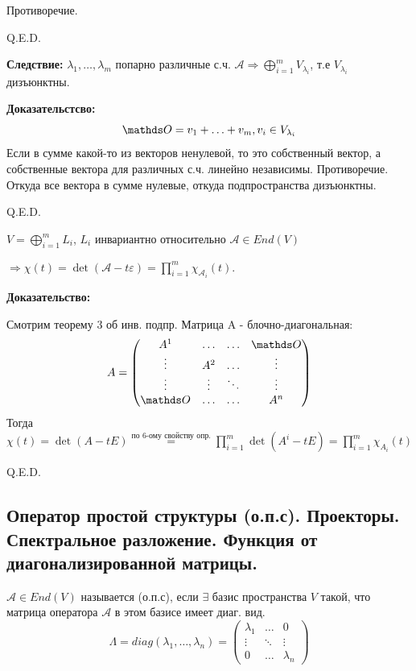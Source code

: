 Противоречие.

\hfill Q.E.D.

\textbf{Следствие:} $\lambda_1, \ldots,\lambda_m$ попарно различные с.ч. $\mathcal{A} \Rightarrow \bigoplus\limits_{i=1}^m V_{\lambda_i}$, т.е $V_{\lambda_i}$ дизъюнктны.

\textbf{Доказательстсво:}
$$\zero = v_1 + \ldots+ v_m, v_i \in V_{\lambda_i}$$
Если в сумме какой-то из векторов ненулевой, то это собственный вектор, а собственные вектора для различных с.ч. линейно независимы. Противоречие. Откуда все вектора в сумме нулевые, откуда подпространства дизъюнктны.

\hfill Q.E.D.


$V = \bigoplus\limits_{i=1}^mL_i$, $L_i$ инвариантно относительно $\mathcal{A} \in End(V)$

$\Rightarrow \chi(t) = \det(\mathcal{A} - t\varepsilon) = \prod\limits_{i=1}^m\chi_{\mathcal{A}_i}(t) $.

\textbf{Доказательство:}

Смотрим теорему 3 об инв. подпр. Матрица A - блочно-диагональная:
$$A = \begin{pmatrix}
    A^1 &\ldots&\ldots& \zero\\
    \vdots &A^2&\ldots& \vdots\\
    \vdots  & \vdots &\ddots& \vdots\\
    \zero & \ldots &\ldots& A^n
\end{pmatrix}$$
  Тогда $\chi(t) = \det(A-tE) \overset{\text{по 6-ому свойству опр.}}= \prod\limits_{i=1}^m \det(A^i-tE) = \prod\limits_{i=1}^m \chi_{A_i}(t) $

\hfill Q.E.D.


\subsection{Оператор простой структуры (о.п.с). Проекторы. Спектральное разложение. Функция от диагонализированной матрицы.}

$\mathcal{A} \in End(V)$ называется  (о.п.с), если $\exists$ базис пространства $V$ такой, что матрица оператора $\mathcal{A}$ в этом базисе имеет диаг. вид.
$$\Lambda = diag(\lambda_1,\ldots,\lambda_n)=\begin{pmatrix}
    \lambda_1 & \ldots & 0 \\
    \vdots & \ddots & \vdots\\
    0 & \ldots &\lambda_n
\end{pmatrix}$$

